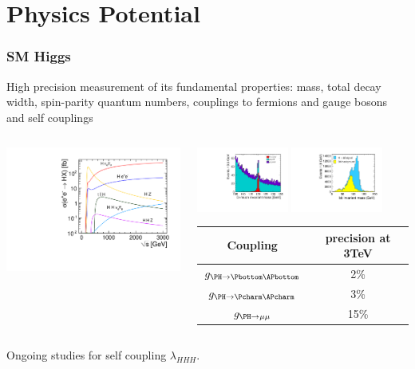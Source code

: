 \documentclass{beamer}
\begin{document}
\section{Physics Potential}
\begin{frame}
\frametitle{SM Higgs}
High precision measurement of its fundamental properties: mass,
total decay width, spin-parity quantum numbers, couplings to fermions and gauge bosons and
self couplings\\
\begin{columns}[c]
\column{6cm}
\includegraphics[width=6cm]{../SIDWorkshop/xsec_vs_cme.pdf}
\column{6cm}
\begin{center}
\includegraphics[width=3cm]{ee_h_mumu_mass_mh120GeV.pdf}
\includegraphics[width=3cm]{../SIDWorkshop/ee_h_bb_mass_mh120GeV.pdf}\\
\begin{tabular}{cc}
Coupling & precision at 3TeV\\
\midrule
$g_{\PH\to\Pbottom\APbottom}$ & 2\%\\
$g_{\PH\to\Pcharm\APcharm}$ & 3\% \\
$g_{\PH\to\mu\mu}$ & 15\%\\
\bottomrule
\end{tabular}
\end{center}
\end{columns}
Ongoing studies for self coupling $\lambda_{HHH}$.
\end{frame}
\end{document}
